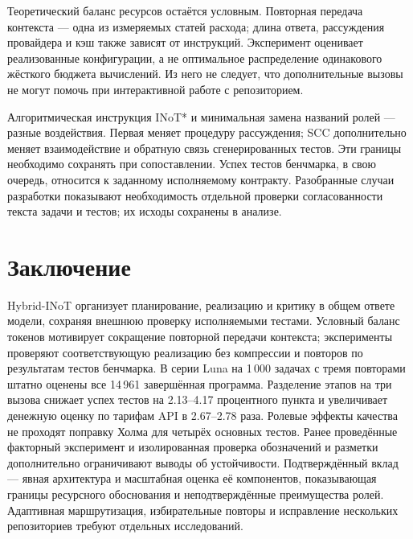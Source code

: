Теоретический баланс ресурсов остаётся условным. Повторная передача контекста --- одна из измеряемых статей расхода; длина ответа, рассуждения провайдера и кэш также зависят от инструкций. Эксперимент оценивает реализованные конфигурации, а не оптимальное распределение одинакового жёсткого бюджета вычислений. Из него не следует, что дополнительные вызовы не могут помочь при интерактивной работе с репозиторием.

Алгоритмическая инструкция INoT* и минимальная замена названий ролей --- разные воздействия. Первая меняет процедуру рассуждения; SCC дополнительно меняет взаимодействие и обратную связь сгенерированных тестов. Эти границы необходимо сохранять при сопоставлении. Успех тестов бенчмарка, в свою очередь, относится к заданному исполняемому контракту. Разобранные случаи разработки показывают необходимость отдельной проверки согласованности текста задачи и тестов; их исходы сохранены в анализе.








\section{Заключение}
Hybrid-INoT организует планирование, реализацию и критику в общем ответе модели, сохраняя внешнюю проверку исполняемыми тестами. Условный баланс токенов мотивирует сокращение повторной передачи контекста; эксперименты проверяют соответствующую реализацию без компрессии и повторов по результатам тестов бенчмарка. В серии Luna на 1\,000 задачах с тремя повторами штатно оценены все 14\,961 завершённая программа. Разделение этапов на три вызова снижает успех тестов на 2.13--4.17 процентного пункта и увеличивает денежную оценку по тарифам API в 2.67--2.78 раза. Ролевые эффекты качества не проходят поправку Холма для четырёх основных тестов. Ранее проведённые факторный эксперимент и изолированная проверка обозначений и разметки дополнительно ограничивают выводы об устойчивости. Подтверждённый вклад --- явная архитектура и масштабная оценка её компонентов, показывающая границы ресурсного обоснования и неподтверждённые преимущества ролей. Адаптивная маршрутизация, избирательные повторы и исправление нескольких репозиториев требуют отдельных исследований.

